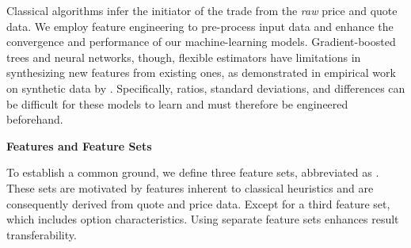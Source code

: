 Classical algorithms infer the initiator of the trade from the \emph{raw} price and quote data. We employ feature engineering to pre-process input data and enhance the convergence and performance of our machine-learning models. Gradient-boosted trees and neural networks, though, flexible estimators have limitations in synthesizing new features from existing ones, as demonstrated in empirical work on synthetic data by \textcite[\checkmark][4--6]{heatonEmpiricalAnalysisFeature2016}. Specifically, ratios, standard deviations, and differences can be difficult for these models to learn and must therefore be engineered beforehand.

\textbf{Features and Feature Sets}

To establish a common ground, we define three feature sets, abbreviated as . These sets are motivated by features inherent to classical heuristics and are consequently derived from quote and price data. Except for a third feature set, which includes option characteristics. Using separate feature sets enhances result transferability.

